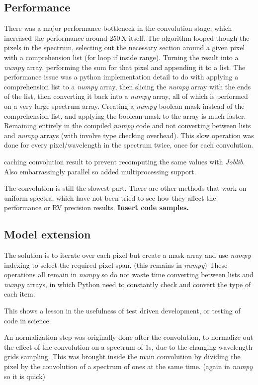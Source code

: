 {\subsection{Performance}
\label{subsec:code_performance}
There was a major performance bottleneck in the convolution stage, which increased the performance around 250\,X itself.
The algorithm looped though the pixels in the spectrum, selecting out the necessary section around a given pixel with a comprehension list (for loop if inside range).
Turning the result into a \emph{numpy} array, performing the sum for that pixel and appending it to a list.
The performance issue was a python implementation detail to do with applying a comprehension list to a \emph{numpy} array, then slicing the \emph{numpy} array with the ends of the list, then converting it back into a \emph{numpy} array, all of which is performed on a very large spectrum array.
Creating a \emph{numpy} boolean mask instead of the comprehension list, and applying the boolean mask to the array is much faster.
Remaining entirely in the compiled \emph{numpy} code and not converting between lists and \emph{numpy} arrays (with involve type checking overhead).
This slow operation was done for every pixel/wavelength in the spectrum twice, once for each convolution.

caching convolution result to prevent recomputing the same values with \emph{Joblib}.
Also embarrassingly parallel so added multiprocessing support.

The convolution is still the slowest part.
There are other methods that work on uniform spectra, which have not been tried to see how they affect the performance or {RV} precision results.
\textbf{Insert code samples.}


\subsection{Model extension}
The solution is to iterate over each pixel but create a mask array and use \emph{numpy} indexing to select the required pixel span.
(this remains in \emph{numpy})
These operations all remain in \emph{numpy} so do not waste time converting between lists and \emph{numpy} arrays, in which Python need to constantly check and convert the type of each item.

This shows a lesson in the usefulness of test driven development, or testing of code in science.


An normalization step was originally done after the convolution, to normalize out the effect of the convolution on a spectrum of 1s, due to the changing wavelength grids sampling.
This was brought inside the main convolution by dividing the pixel by the convolution of a spectrum of ones at the same time.
 (again in \emph{numpy} so it is quick)

}
